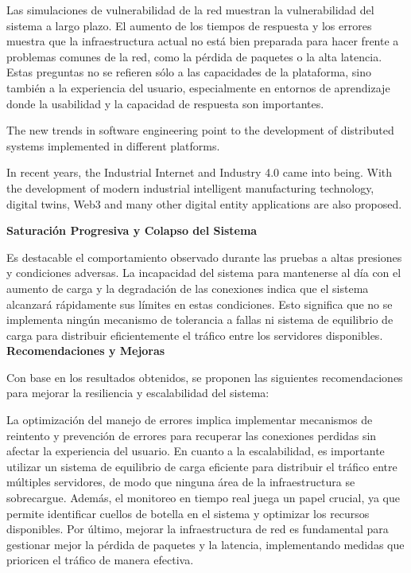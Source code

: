 \documentclass{article}
\begin{document}
Las simulaciones de vulnerabilidad de la red muestran la vulnerabilidad del sistema a largo plazo. El aumento de los tiempos de respuesta y los errores muestra que la infraestructura actual no está bien preparada para hacer frente a problemas comunes de la red, como la pérdida de paquetes o la alta latencia. Estas preguntas no se refieren sólo a las capacidades de la plataforma, sino también a la experiencia del usuario, especialmente en entornos de aprendizaje donde la usabilidad y la capacidad de respuesta son importantes.

The new trends in software engineering point to the development of distributed systems implemented in different platforms.\parencite{Gómez-Baryolo2017}

In recent years, the Industrial Internet and Industry 4.0 came into being. With the development of modern industrial intelligent manufacturing technology, digital twins, Web3 and many other digital entity applications are also proposed. \parencite{Huang2024853}

\textbf{Saturación Progresiva y Colapso del Sistema}

Es destacable el comportamiento observado durante las pruebas a altas presiones y condiciones adversas. La incapacidad del sistema para mantenerse al día con el aumento de carga y la degradación de las conexiones indica que el sistema alcanzará rápidamente sus límites en estas condiciones. Esto significa que no se implementa ningún mecanismo de tolerancia a fallas ni sistema de equilibrio de carga para distribuir eficientemente el tráfico entre los servidores disponibles.
\textbf{Recomendaciones y Mejoras}

Con base en los resultados obtenidos, se proponen las siguientes recomendaciones para mejorar la resiliencia y escalabilidad del sistema:

La optimización del manejo de errores implica implementar mecanismos de reintento y prevención de errores para recuperar las conexiones perdidas sin afectar la experiencia del usuario. En cuanto a la escalabilidad, es importante utilizar un sistema de equilibrio de carga eficiente para distribuir el tráfico entre múltiples servidores, de modo que ninguna área de la infraestructura se sobrecargue. Además, el monitoreo en tiempo real juega un papel crucial, ya que permite identificar cuellos de botella en el sistema y optimizar los recursos disponibles. Por último, mejorar la infraestructura de red es fundamental para gestionar mejor la pérdida de paquetes y la latencia, implementando medidas que prioricen el tráfico de manera efectiva.
\end{document}
